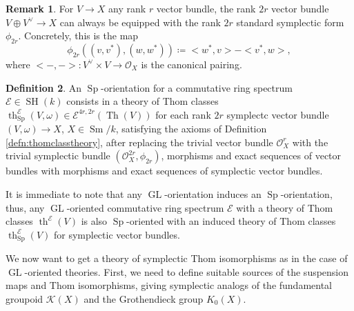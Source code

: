 \documentclass[10pt]{amsart}
\theoremstyle{definition}
\newtheorem{defn}{Definition}[section]
\newtheorem{rmk}[defn]{Remark}
\theoremstyle{plain}
\numberwithin{equation}{section}
\newcommand{\0}{\emptyset}
\newcommand{\sE}{{\mathcal E}}
\newcommand{\sK}{{\mathcal K}}
\newcommand{\GL}{{\operatorname{GL}}}
\newcommand{\Sp}{{\operatorname{Sp}}}
\newcommand{\SH}{{\operatorname{SH}}}
\newcommand{\Th}{{\operatorname{Th}}}
\newcommand{\Sm}{{\operatorname{Sm}}}
\renewcommand{\th}{{\operatorname{th}}}
\begin{document}
\begin{rmk}
    For $V\to X$ any rank $r$ vector bundle, the rank $2r$ vector bundle $V \oplus V^\vee \to X$ can always be equipped with the rank $2r$ standard symplectic form $\phi_{2r}$. Concretely, this is the map
    $$\phi_{2r}((v,v^*),(w,w^*)) \coloneqq <w^*,v> -<v^*,w>,$$
    where $<-,->:V^\vee \times V \to \mathcal{O}_X$ is the canonical pairing.
\end{rmk}

\begin{defn}
    An $\Sp$-orientation for a commutative ring spectrum $\sE \in \SH(k)$ consists in a theory of Thom classes $\th_{\Sp}^\sE(V,\omega) \in \sE^{4r,2r}(\Th(V))$ for each rank $2r$ symplectc vector bundle $(V,\omega)\to X$, $X \in \Sm/k$, satisfying the axioms of Definition \ref{defn:thomclasstheory}, after replacing the trivial vector bundle $\mathcal{O}^r_X$ with the trivial symplectic bundle $(\mathcal{O}_X^{2r},\phi_{2r})$, morphisms and exact sequences of vector bundles with morphisms and exact sequences of symplectic vector bundles.
\end{defn}

It is immediate to note that any $\GL$-orientation induces an $\Sp$-orientation, thus, any $\GL$-oriented commutative ring spectrum $\sE$ with a theory of Thom classes $\th^\sE(V)$ is also $\Sp$-oriented with an induced theory of Thom classes $\th_\Sp^\sE(V)$ for symplectic vector bundles.

We now want to get a theory of symplectic Thom isomorphisms as in the case of $\GL$-oriented theories. First, we need to define suitable sources of the suspension maps and Thom isomorphisms, giving symplectic analogs of the fundamental groupoid $\sK(X)$ and the Grothendieck group $K_0(X)$.
\end{document}
